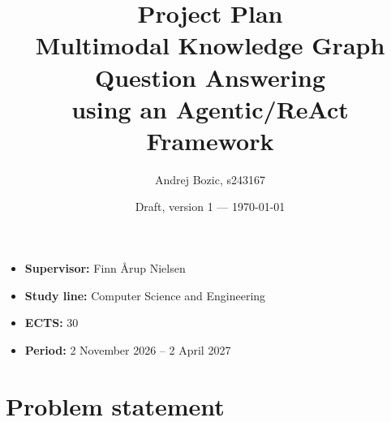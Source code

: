 \documentclass[a4paper,11pt]{article}
\title{Project Plan\\[0.5em]\large Multimodal Knowledge Graph
Question Answering\\ using an Agentic/ReAct Framework}
\author{Andrej Bozic, s243167}
\date{Draft, version 1 --- \today}
\newif\ifshowsupervisorq
\newcommand{\supervisorq}[1]{%
  \ifshowsupervisorq
  \begin{supervisorqbox}#1
  \end{supervisorqbox}%
  \fi
}
\begin{document}
\maketitle

\begin{itemize}
  \item \textbf{Supervisor:} Finn Årup Nielsen
  \item \textbf{Study line:} Computer Science and Engineering
  \item \textbf{ECTS:} 30
  \item \textbf{Period:} 2 November 2026 -- 2 April 2027
\end{itemize}

\supervisorq{Is there a required format or length for the project
plan? Is bullet point version fine?}

\section{Problem statement}
\end{document}
